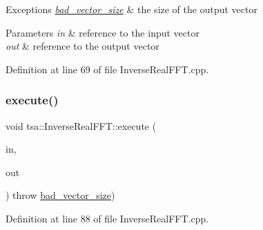 \begin{DoxyExceptions}{Exceptions}
{\em \hyperlink{classtsa_1_1bad__vector__size}{bad\+\_\+vector\+\_\+size}} & the size of the output vector\\
\hline
\end{DoxyExceptions}

\begin{DoxyParams}{Parameters}
{\em in} & reference to the input vector \\
\hline
{\em out} & reference to the output vector \\
\hline
\end{DoxyParams}


Definition at line 69 of file Inverse\+Real\+F\+F\+T.\+cpp.

\mbox{\label{classtsa_1_1_inverse_real_f_f_t_aaa4b1dd80a308eb09a9dc9fe1aeba51e}} 
\subsubsection{\texorpdfstring{execute()}{execute()}\hspace{0.1cm}{\footnotesize\ttfamily [3/4]}}
{\footnotesize\ttfamily void tsa\+::\+Inverse\+Real\+F\+F\+T\+::execute (\begin{DoxyParamCaption}\item[{\hyperlink{namespacetsa_ad294f56c16152a1618cbe2f19b768e2e}{Cmatrix\+Row} \&}]{in,  }\item[{\hyperlink{namespacetsa_aeaf3be962a114beef3d9e89b0fb49bf4}{Dmatrix\+Row} \&}]{out }\end{DoxyParamCaption}) throw  \hyperlink{classtsa_1_1bad__vector__size}{bad\+\_\+vector\+\_\+size}) }



Definition at line 88 of file Inverse\+Real\+F\+F\+T.\+cpp.

\mbox{\label{classtsa_1_1_inverse_real_f_f_t_a6264c0d0b0b4a31e584a390b06281631}} 
